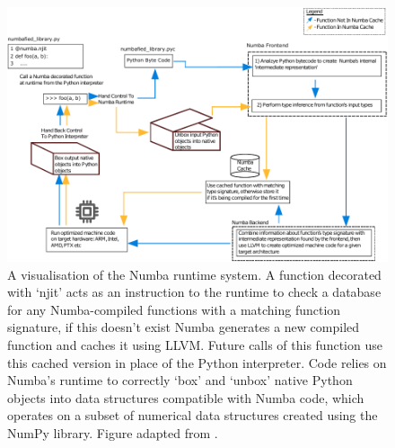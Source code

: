 \begin{figure}[h]
    \centering
    \includegraphics[width=\linewidth]{images/ch_1/numba.pdf}
    \caption{A visualisation of the Numba runtime system. A function decorated with `njit' acts as an instruction to the runtime to check a database for any Numba-compiled functions with a matching function signature, if this doesn't exist Numba generates a new compiled function and caches it using LLVM. Future calls of this function use this cached version in place of the Python interpreter. Code relies on Numba's runtime to correctly `box' and `unbox' native Python objects into data structures compatible with Numba code, which operates on a subset of numerical data structures created using the NumPy library. Figure adapted from \cite{kailasa2022pyexafmm}.}
    \label{fig:chpt:1:sec:1:numba_runtime}
\end{figure}


\pagebreak

